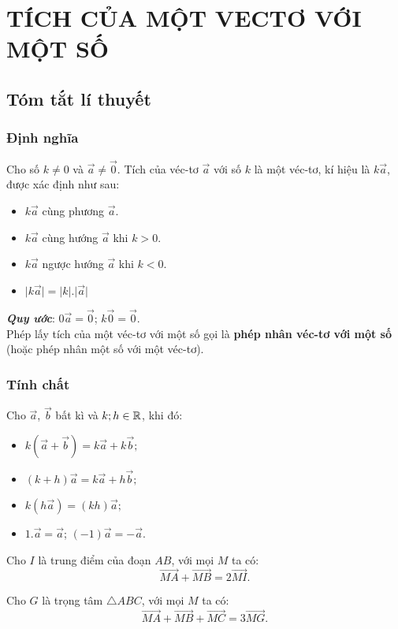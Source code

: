 \section{TÍCH CỦA MỘT VECTƠ VỚI MỘT SỐ}
\subsection{Tóm tắt lí thuyết}%
\subsubsection*{Định nghĩa}
\begin{dn}
Cho số $k\ne 0$ và $\vec{a}\ne \vec{0}$. Tích của véc-tơ $\vec{a}$ với số $k$ là một véc-tơ, kí hiệu là $k\vec{a}$, được xác định như sau:
\end{dn}
\begin{itemize}
\item
$k\vec{a}$ cùng phương $\vec{a}$.
\item 
$k\vec{a}$ cùng hướng $\vec{a}$ khi $k>0.$
\item 
$k\vec{a}$ ngược hướng $\vec{a}$ khi $k<0.$
\item 
$\vert k\vec{a}\vert=\vert k \vert.\vert \vec{a}\vert$
\end{itemize}
\textbf{\textit{Quy ước}}: $0\vec{a}=\vec{0}$; $k\vec{0}=\vec{0}.$\\
Phép lấy tích của một véc-tơ với một số gọi là \textbf{phép nhân véc-tơ với một số }(hoặc phép nhân một số với một véc-tơ).
\subsubsection*{Tính chất}
\begin{tc}
Cho $\vec{a}$, $\vec{b}$ bất kì và $k; h\in \Bbb{R}$, khi đó:
\begin{itemize}
\item $k(\vec{a}+\vec{b})=k\vec{a}+k\vec{b};$
\item $(k+h) \vec{a}=k\vec{a}+h\vec{b};$
\item $k(h\vec{a})=(kh)\vec{a};$
\item $1.\vec{a}=\vec{a}$; $(-1)\vec{a}=-\vec{a}.$
\end{itemize}
\end{tc}
\begin{tc}
Cho $I$ là trung điểm của đoạn $AB$, với mọi $M$ ta có: $$\vec{MA}+\vec{MB}=2\vec{MI}.$$
\end{tc}
\begin{tc}
Cho $G$ là trọng tâm $\bigtriangleup ABC$, với mọi $M$ ta có:$$\vec{MA}+\vec{MB}+\vec{MC}=3\vec{MG}.$$
\end{tc}
